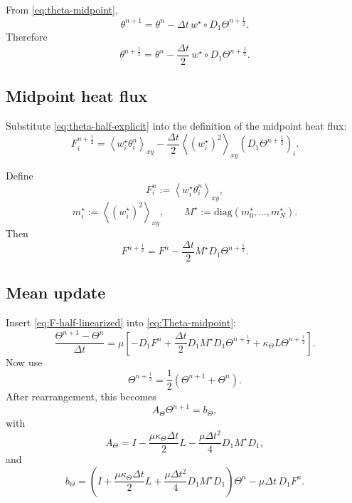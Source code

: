 \documentclass[11pt]{article}
\begin{document}
From \eqref{eq:theta-midpoint},
\[
\theta^{n+1}
=
\theta^n
-
\Delta t\,
w^\star \circ D_1\Theta^{n+\frac12}.
\]
Therefore
\begin{equation}
\theta^{n+\frac12}
=
\theta^n
-
\frac{\Delta t}{2}\,
w^\star \circ D_1\Theta^{n+\frac12}.
\label{eq:theta-half-explicit}
\end{equation}

\subsection{Midpoint heat flux}

Substitute \eqref{eq:theta-half-explicit} into the definition of the midpoint heat flux:
\[
F_i^{n+\frac12}
=
\left\langle
w_i^\star \theta_i^n
\right\rangle_{xy}
-
\frac{\Delta t}{2}
\left\langle
(w_i^\star)^2
\right\rangle_{xy}
(D_1\Theta^{n+\frac12})_i.
\]

Define
\begin{equation}
F_i^n := \left\langle w_i^\star \theta_i^n \right\rangle_{xy},
\label{eq:F-n}
\end{equation}
\begin{equation}
m_i^\star := \left\langle (w_i^\star)^2 \right\rangle_{xy},
\qquad
M^\star := \mathrm{diag}(m_0^\star,\dots,m_N^\star).
\label{eq:m-star}
\end{equation}
Then
\begin{equation}
F^{n+\frac12}
=
F^n
-
\frac{\Delta t}{2}
M^\star D_1 \Theta^{n+\frac12}.
\label{eq:F-half-linearized}
\end{equation}

\subsection{Mean update}

Insert \eqref{eq:F-half-linearized} into \eqref{eq:Theta-midpoint}:
\[
\frac{\Theta^{n+1}-\Theta^n}{\Delta t}
=
\mu
\left[
- D_1 F^n
+
\frac{\Delta t}{2}
D_1 M^\star D_1 \Theta^{n+\frac12}
+
\kappa_\Theta L\Theta^{n+\frac12}
\right].
\]
Now use
\[
\Theta^{n+\frac12} = \frac12(\Theta^{n+1}+\Theta^n).
\]
After rearrangement, this becomes
\begin{equation}
A_\Theta \Theta^{n+1} = b_\Theta,
\label{eq:Ath-theta}
\end{equation}
with
\begin{equation}
A_\Theta
=
I
-
\frac{\mu \kappa_\Theta \Delta t}{2}L
-
\frac{\mu \Delta t^2}{4} D_1 M^\star D_1,
\label{eq:ATheta}
\end{equation}
and
\begin{equation}
b_\Theta
=
\left(
I
+
\frac{\mu \kappa_\Theta \Delta t}{2}L
+
\frac{\mu \Delta t^2}{4} D_1 M^\star D_1
\right)\Theta^n
-
\mu\Delta t\, D_1 F^n.
\label{eq:bTheta}
\end{equation}
\end{document}
